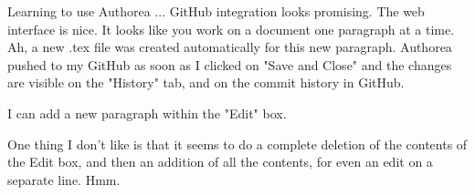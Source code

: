 Learning to use Authorea ... GitHub integration looks promising. The web interface is nice. It looks like you work on a document one paragraph at a time. Ah, a new .tex file was created automatically for this new paragraph. Authorea pushed to my GitHub as soon as I clicked on "Save and Close" and the changes are visible on the "History" tab, and on the commit history in GitHub.

I can add a new paragraph within the "Edit" box.

One thing I don't like is that it seems to do a complete deletion of the contents of the Edit box, and then an addition of all the contents, for even an edit on a separate line. Hmm.